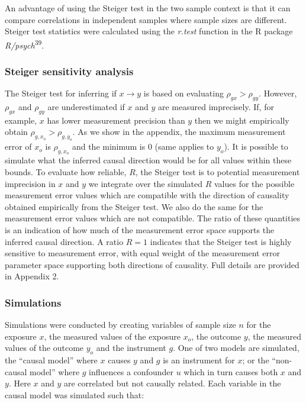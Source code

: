 \documentclass[]{article}
\begin{document}
An advantage of using the Steiger test in the two sample context is that
it can compare correlations in independent samples where sample sizes
are different. Steiger test statistics were calculated using the
\emph{r.test} function in the R package
\emph{R/psych}\textsuperscript{39}.

\subsubsection{Steiger sensitivity
analysis}\label{steiger-sensitivity-analysis}

The Steiger test for inferring if \(x \rightarrow y\) is based on
evaluating \(\rho_{gx} > \rho_{gy}\). However, \(\rho_{gx}\) and
\(\rho_{gy}\) are underestimated if \(x\) and \(y\) are measured
imprecisely. If, for example, \(x\) has lower measurement precision than
\(y\) then we might empirically obtain \(\rho_{g,x_o} > \rho_{g,y_o}\).
As we show in the appendix, the maximum measurement error of \(x_o\) is
\(\rho_{g,x_o}\) and the minimum is 0 (same applies to \(y_o\)). It is
possible to simulate what the inferred causal direction would be for all
values within these bounds. To evaluate how reliable, \(R\), the Steiger
test is to potential measurement imprecision in \(x\) and \(y\) we
integrate over the simulated \(R\) values for the possible measurement
error values which are compatible with the direction of causality
obtained empirically from the Steiger test. We also do the same for the
measurement error values which are not compatible. The ratio of these
quantities is an indication of how much of the measurement error space
supports the inferred causal direction. A ratio \(R=1\) indicates that
the Steiger test is highly sensitive to measurement error, with equal
weight of the measurement error parameter space supporting both
directions of causality. Full details are provided in Appendix 2.

\subsubsection{Simulations}\label{simulations}

Simulations were conducted by creating variables of sample size \(n\)
for the exposure \(x\), the measured values of the exposure \(x_o\), the
outcome \(y\), the measured values of the outcome \(y_o\) and the
instrument \(g\). One of two models are simulated, the ``causal model''
where \(x\) causes \(y\) and \(g\) is an instrument for \(x\); or the
``non-causal model'' where \(g\) influences a confounder \(u\) which in
turn causes both \(x\) and \(y\). Here \(x\) and \(y\) are correlated
but not causally related. Each variable in the causal model was
simulated such that:
\end{document}
